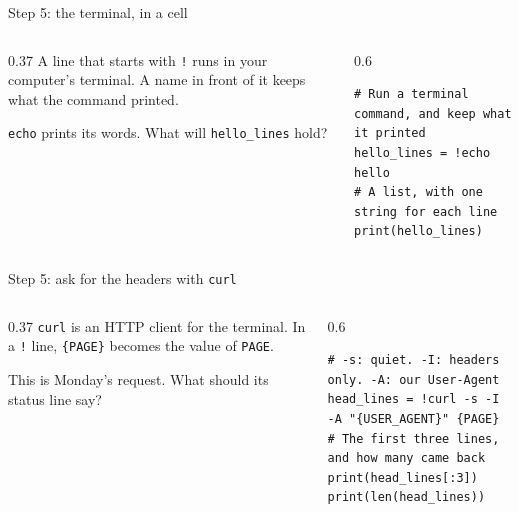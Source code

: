\documentclass[9pt,aspectratio=169]{beamer}
\begin{document}
\begin{frame}[fragile]{Step 5: the terminal, in a cell}
    \begin{columns}[T]
        \begin{column}{0.37\textwidth}
            A line that starts with \texttt{!} runs in your computer's terminal. A name in front of it keeps what the command printed.

            \medskip
            \texttt{echo} prints its words. What will \texttt{hello\_lines} hold?
        \end{column}
        \begin{column}{0.6\textwidth}
\begin{lstlisting}[style=lab]
# Run a terminal command, and keep what it printed
hello_lines = !echo hello
# A list, with one string for each line
print(hello_lines)
\end{lstlisting}
        \end{column}
    \end{columns}
\end{frame}

\begin{frame}[fragile]{Step 5: ask for the headers with \texttt{curl}}
    \begin{columns}[T]
        \begin{column}{0.37\textwidth}
            \texttt{curl} is an HTTP client for the terminal. In a \texttt{!} line, \texttt{\{PAGE\}} becomes the value of \texttt{PAGE}.

            \medskip
            This is Monday's request. What should its status line say?
        \end{column}
        \begin{column}{0.6\textwidth}
\begin{lstlisting}[style=lab]
# -s: quiet. -I: headers only. -A: our User-Agent
head_lines = !curl -s -I -A "{USER_AGENT}" {PAGE}
# The first three lines, and how many came back
print(head_lines[:3])
print(len(head_lines))
\end{lstlisting}
        \end{column}
    \end{columns}
\end{frame}
\end{document}
